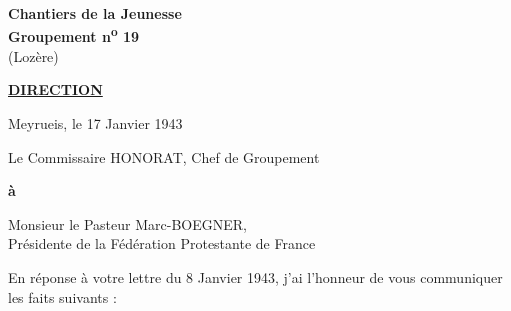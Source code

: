 
\begin{center}
\textbf{\large Chantiers de la Jeunesse}\\
\textbf{Groupement n\textsuperscript{o} 19}\\
(Lozère)
\end{center}

\noindent\textbf{\underline{DIRECTION}}

\begin{flushright}
Meyrueis, le 17 Janvier 1943
\end{flushright}

\noindent
Le Commissaire HONORAT, Chef de Groupement

\vspace{1em}

\noindent
\textbf{à}

\begin{center}
Monsieur le Pasteur Marc-BOEGNER,\\
Présidente de la Fédération Protestante de France
\end{center}

\vspace{1em}

En réponse à votre lettre du 8 Janvier 1943, j’ai l’honneur
de vous communiquer les faits suivants :

